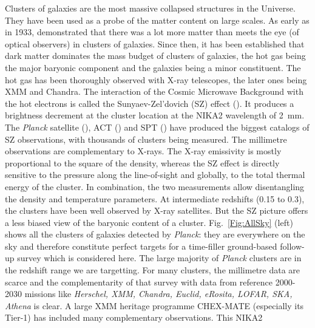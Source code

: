 \documentclass[10pt,a4paper,twoside,graphicx,color]{article}
\begin{document}
\vspace{-0.1cm}  Clusters
of galaxies are the most massive collapsed structures in the
Universe. They have been used as a probe of the matter content on
large scales. As early as in 1933, \cite{Zwicky1933} demonstrated that
there was a lot more matter than meets the eye (of optical observers)
in clusters of galaxies. Since then, it has been established that dark
matter dominates the mass budget of clusters of galaxies, the hot gas
being the major baryonic component and the galaxies being a minor
constituent. The hot gas has been thoroughly observed with X-ray
telescopes, the later ones being XMM and Chandra. The interaction of
the Cosmic Microwave Background with the hot electrons is called the
Sunyaev-Zel'dovich (SZ) effect (\cite{SZ1972}). It produces a
brightness decrement at the cluster location at the NIKA2 wavelength
of 2~mm.  The {\sl Planck} satellite (\cite{PSZ2}), ACT
(\cite{Hilton2021}) and SPT (\cite{Bleem2015}) have produced the
biggest catalogs of SZ observations, with thousands of clusters being
measured. The millimetre observations are complementary to X-rays. The
X-ray emissivity is mostly proportional to the square of the density,
whereas the SZ effect is directly sensitive to the pressure along the
line-of-sight and globally, to the total thermal energy of the
cluster. In combination, the two measurements allow disentangling the
density and temperature parameters. At intermediate redshifts (0.15 to
0.3), the clusters have been well observed by X-ray satellites. But
the SZ picture offers a less biased view of the baryonic content of a
cluster. 
Fig.~\ref{Fig:AllSky} (left) shows all the clusters of galaxies
detected by {\sl Planck}: they are everywhere on the sky and therefore
constitute perfect targets for a time-filler ground-based follow-up
survey which is considered here. The large majority of {\sl Planck}
clusters are in the redshift range we are targetting. For many
clusters, the millimetre data are scarce and the complementarity of
that survey with data from reference 2000-2030 missions like {\sl
  Herschel, XMM, Chandra, Euclid, eRosita, LOFAR, SKA, Athena} is
clear. A large XMM heritage programme CHEX-MATE (especially its
Tier-1) has included many complementary observations. This NIKA2
\end{document}
